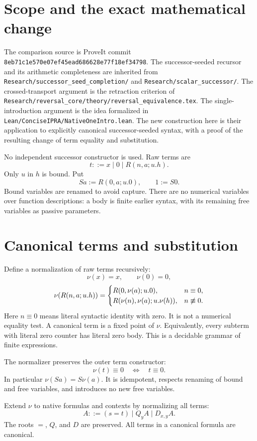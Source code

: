 \documentclass[11pt]{article}
\theoremstyle{definition}
\newcommand{\norm}[1]{\nu(#1)}
\newcommand{\lit}{\mathrel{\equiv}}
\newcommand{\file}[1]{{\small\nolinkurl{#1}}}
\begin{document}
\section{Scope and the exact mathematical change}

The comparison source is ProveIt commit
\texttt{8eb71c1e570e07ef45ead686628e77f18ef34798}.
The successor-seeded recursor and its arithmetic completeness are inherited from
\file{Research/successor_seed_completion/} and
\file{Research/scalar_successor/}.
The crossed-transport argument is the retraction criterion of
\file{Research/reversal_core/theory/reversal_equivalence.tex}.
The single-introduction argument is the idea formalized in
\file{Lean/ConciseIPRA/NativeOneIntro.lean}.
The new construction here is their application to explicitly canonical successor-seeded syntax, with a proof of the resulting change of term equality and substitution.

No independent successor constructor is used. Raw terms are
\[
t::=x\mid 0\mid R(n,a;u.h).
\]
Only \(u\) in \(h\) is bound. Put
\[
Sa:=R(0,a;u.0),\qquad 1:=S0.
\]
Bound variables are renamed to avoid capture. There are no numerical variables over function descriptions: a body is finite earlier syntax, with its remaining free variables as passive parameters.

\section{Canonical terms and substitution}

Define a normalization of raw terms recursively:
\[
\norm{x}=x,\qquad \norm{0}=0,
\]
\[
\norm{R(n,a;u.h)}=
\begin{cases}
R(0,\norm a;u.0),&n\lit0,\\
R(\norm n,\norm a;u.\norm h),&n\not\lit0.
\end{cases}
\]
Here \(n\lit0\) means literal syntactic identity with zero. It is not a numerical equality test. A canonical term is a fixed point of \(\nu\). Equivalently, every subterm with literal zero counter has literal zero body. This is a decidable grammar of finite expressions.

The normalizer preserves the outer term constructor:
\[
\norm t\lit0\quad\Longleftrightarrow\quad t\lit0.
\]
In particular \(\norm{Sa}=S\norm a\). It is idempotent, respects renaming of bound and free variables, and introduces no new free variables.

Extend \(\nu\) to native formulas and contexts by normalizing all terms:
\[
A::=(s=t)\mid Q_y A\mid D_{x,y}A.
\]
The roots \(=\), \(Q\), and \(D\) are preserved. All terms in a canonical formula are canonical.
\end{document}
